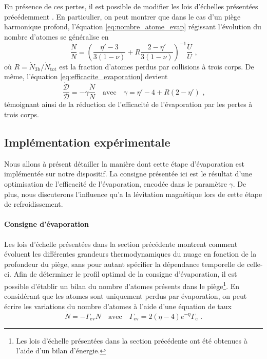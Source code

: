 En présence de ces pertes, il est possible de modifier les lois d'échelles présentées précédemment \citep{luiten1996kinetic}\citep{brantut2009manipulation}. En particulier, on peut montrer que dans le cas d'un piège harmonique profond, l'équation \ref{eq:nombre_atome_evap} régissant l'évolution du nombre d'atomes se généralise en
\begin{equation}
\frac{\dot{N}}{N}= \left( \frac{\eta'-3}{3(1-\nu)} + R \frac{2-\eta'}{3(1-\nu)} \right)^{-1} \frac{\dot{U}}{U} \text{ ,}
\label{eq:scaling_atomes_3corps}
\end{equation}
où $R=\dot{N}_{\mathrm{3b}}/\dot{N}_{\mathrm{tot}}$ est la fraction d'atomes perdus par collisions à trois corps. De même, l'équation \ref{eq:efficacite_evaporation} devient
\begin{equation}
\frac{\dot{\mathcal{D}}}{\mathcal{D}}=-\gamma \frac{\dot{N}}{N} \quad \text{avec} \quad \gamma=\eta'-4 + R(2-\eta') \text{ ,}
\label{eq:efficacite_evap_3corps}
\end{equation}
témoignant ainsi de la réduction de l'efficacité de l'évaporation par les pertes à trois corps.


\subsection{Implémentation expérimentale}
Nous allons à présent détailler la manière dont cette étape d'évaporation est implémentée sur notre dispositif. La consigne présentée ici est le résultat d'une optimisation de l'efficacité de l'évaporation, encodée dans le paramètre $\gamma$. De plus, nous discuterons l'influence qu'a la lévitation magnétique lors de cette étape de refroidissement.



\paragraph*{Consigne d'évaporation}
Les lois d'échelle présentées dans la section précédente montrent comment évoluent les différentes grandeurs thermodynamiques du nuage en fonction de la profondeur du piège, sans pour autant spécifier la dépendance temporelle de celle-ci. Afin de déterminer le profil optimal de la consigne d'évaporation, il est possible d'établir un bilan du nombre d'atomes présents dans le piège\footnote{Les lois d'échelle présentées dans la section précédente ont été obtenues à l'aide d'un bilan d'énergie.}.
En considérant que les atomes sont uniquement perdus par évaporation, on peut écrire les variations du nombre d'atomes à l'aide d'une équation de taux \citep{luiten1996kinetic}\citep{o2001scaling}
\begin{equation}
\dot{N} = - \Gamma_{\mathrm{ev}} N \quad \text{avec} \quad \Gamma_{\mathrm{ev}}=2(\eta-4) e^{-\eta} \Gamma_{\mathrm{c}} \text{ .}
\label{eq:pertes_evap_naturelle}
\end{equation}


